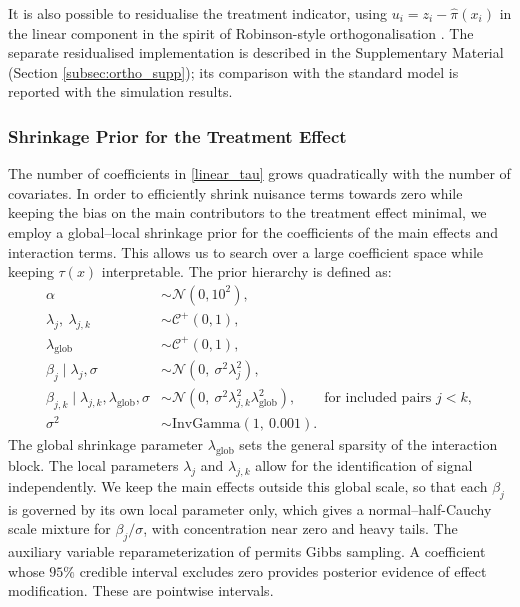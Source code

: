 \documentclass[12pt]{article}
\newcommand{\rev}[1]{\ifdefined\ReviewChanges{\color{revisionblue}#1}\else#1\fi}
\begin{document}
It is also possible to residualise the treatment indicator, \rev{using $u_i=z_i-\hat{\pi}(x_i)$ in the linear component} in the spirit of Robinson-style orthogonalisation \citep{robinson1988root}. The separate residualised implementation is described in the Supplementary Material (Section \ref{subsec:ortho_supp}); its comparison with the standard model is reported with the simulation results.

\subsubsection{Shrinkage Prior for the Treatment Effect}
\label{subsec:inference}
The number of coefficients in \eqref{linear_tau} grows quadratically with the number of covariates. In order to efficiently shrink nuisance terms towards zero while keeping the bias on the main contributors to the treatment effect minimal, we employ a global--local shrinkage prior \citep{carvalho2010horseshoe} for the coefficients of the main effects and interaction terms. This allows us to search over a large coefficient space while keeping $\tau(x)$ interpretable. The prior hierarchy is defined as:
\begin{align}
    \alpha &\sim \mathcal{N}(0, 10^2), \nonumber\\
    \lambda_{j},\ \lambda_{j,k} &\sim \mathcal{C}^+(0, 1), \nonumber\\
    \lambda_{\mathrm{glob}} &\sim \mathcal{C}^+(0, 1), \nonumber\\
    \beta_{j} \mid \lambda_{j}, \sigma &\sim
      \mathcal{N}\!\left(0,\ \sigma^2 \lambda_{j}^2\right),
      \label{eq:hshc_main}\\
    \beta_{j,k} \mid \lambda_{j,k}, \lambda_{\mathrm{glob}}, \sigma &\sim
      \mathcal{N}\!\left(0,\ \sigma^2 \lambda_{j,k}^2 \lambda_{\mathrm{glob}}^2\right),
      \qquad \text{for included pairs }j<k, \label{eq:hshc_int}\\
    \sigma^2 &\sim \mathrm{InvGamma}(1,\ 0.001). \nonumber
\end{align}
The global shrinkage parameter $\lambda_{\mathrm{glob}}$ sets the general sparsity of the interaction block. The local parameters $\lambda_{j}$ and $\lambda_{j,k}$ allow for the identification of signal independently. We keep the main effects outside this global scale, so that each $\beta_j$ is governed by its own local parameter only, which gives a normal--half-Cauchy scale mixture for $\beta_j/\sigma$, with concentration near zero and heavy tails. The auxiliary variable reparameterization of \cite{makalic2015simple} permits Gibbs sampling. A coefficient whose $95\%$ credible interval excludes zero provides posterior evidence of effect modification. These are pointwise intervals.
\end{document}
